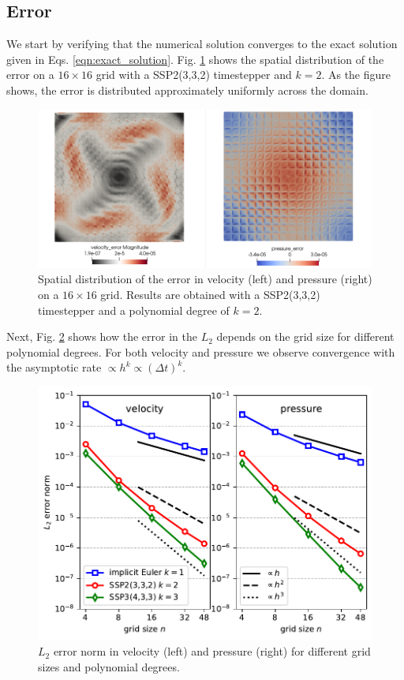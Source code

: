 \documentclass[11pt]{article}
\begin{document}
\subsection{Error}
We start by verifying that the numerical solution converges to the exact solution given in Eqs. \eqref{eqn:exact_solution}. Fig. \ref{fig:spatial_error} shows the spatial distribution of the error on a $16\times 16$ grid with a SSP2(3,3,2) timestepper and $k=2$. As the figure shows, the error is distributed approximately uniformly across the domain.
\begin{figure}
    \begin{center}
        \includegraphics[width=1.0\linewidth]{figures/error_spatial.png}
        \caption{Spatial distribution of the error in velocity (left) and pressure (right) on a $16\times 16$ grid. Results are obtained with a SSP2(3,3,2) timestepper and a polynomial degree of $k=2$.}
        \label{fig:spatial_error}
    \end{center}
\end{figure}
Next, Fig. \ref{fig:L2error} shows how the error in the $L_2$ depends on the grid size for different polynomial degrees. For both velocity and pressure we observe convergence with the asymptotic rate  $\propto h^{k}\propto (\Delta t)^k$.
\begin{figure}
    \begin{center}
        \includegraphics[width=0.75\linewidth]{figures/L2error.pdf}
        \caption{$L_2$ error norm in velocity (left) and pressure (right) for different grid sizes and polynomial degrees.}
        \label{fig:L2error}
    \end{center}
\end{figure}
\end{document}
